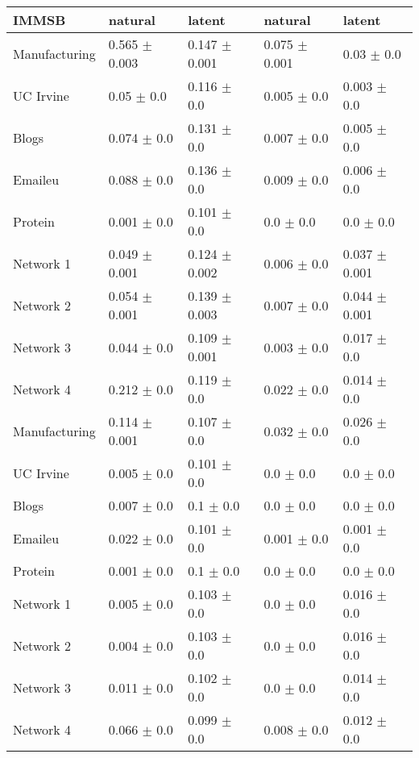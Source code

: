 \begin{tabular}{@{}lllll@{}}
\toprule

\textbf{IMMSB} & natural & latent & natural & latent \\\midrule

Manufacturing & 0.565 \(\pm\) 0.003 & 0.147 \(\pm\) 0.001 & 0.075
\(\pm\) 0.001 & 0.03 \(\pm\) 0.0 \\
UC Irvine & 0.05 \(\pm\) 0.0 & 0.116 \(\pm\) 0.0 & 0.005 \(\pm\)
0.0 & 0.003 \(\pm\) 0.0 \\
Blogs & 0.074 \(\pm\) 0.0 & 0.131 \(\pm\) 0.0 & 0.007 \(\pm\)
0.0 & 0.005 \(\pm\) 0.0 \\
Emaileu & 0.088 \(\pm\) 0.0 & 0.136 \(\pm\) 0.0 & 0.009 \(\pm\)
0.0 & 0.006 \(\pm\) 0.0 \\
Protein & 0.001 \(\pm\) 0.0 & 0.101 \(\pm\) 0.0 & 0.0 \(\pm\) 0.0 & 0.0
\(\pm\) 0.0 \\
Network 1 & 0.049 \(\pm\) 0.001 & 0.124 \(\pm\) 0.002 & 0.006 \(\pm\)
0.0 & 0.037 \(\pm\) 0.001 \\
Network 2 & 0.054 \(\pm\) 0.001 & 0.139 \(\pm\) 0.003 & 0.007 \(\pm\)
0.0 & 0.044 \(\pm\) 0.001 \\
Network 3 & 0.044 \(\pm\) 0.0 & 0.109 \(\pm\) 0.001 & 0.003 \(\pm\)
0.0 & 0.017 \(\pm\) 0.0 \\
Network 4 & 0.212 \(\pm\) 0.0 & 0.119 \(\pm\) 0.0 & 0.022 \(\pm\)
0.0 & 0.014 \(\pm\) 0.0 \\
Manufacturing & 0.114 \(\pm\) 0.001 & 0.107 \(\pm\) 0.0 & 0.032 \(\pm\)
0.0 & 0.026 \(\pm\) 0.0 \\
UC Irvine & 0.005 \(\pm\) 0.0 & 0.101 \(\pm\) 0.0 & 0.0 \(\pm\)
0.0 & 0.0 \(\pm\) 0.0 \\
Blogs & 0.007 \(\pm\) 0.0 & 0.1 \(\pm\) 0.0 & 0.0 \(\pm\) 0.0 & 0.0
\(\pm\) 0.0 \\
Emaileu & 0.022 \(\pm\) 0.0 & 0.101 \(\pm\) 0.0 & 0.001 \(\pm\)
0.0 & 0.001 \(\pm\) 0.0 \\
Protein & 0.001 \(\pm\) 0.0 & 0.1 \(\pm\) 0.0 & 0.0 \(\pm\) 0.0 & 0.0
\(\pm\) 0.0 \\
Network 1 & 0.005 \(\pm\) 0.0 & 0.103 \(\pm\) 0.0 & 0.0 \(\pm\)
0.0 & 0.016 \(\pm\) 0.0 \\
Network 2 & 0.004 \(\pm\) 0.0 & 0.103 \(\pm\) 0.0 & 0.0 \(\pm\)
0.0 & 0.016 \(\pm\) 0.0 \\
Network 3 & 0.011 \(\pm\) 0.0 & 0.102 \(\pm\) 0.0 & 0.0 \(\pm\)
0.0 & 0.014 \(\pm\) 0.0 \\
Network 4 & 0.066 \(\pm\) 0.0 & 0.099 \(\pm\) 0.0 & 0.008 \(\pm\)
0.0 & 0.012 \(\pm\) 0.0 \\

\bottomrule
\end{tabular}
